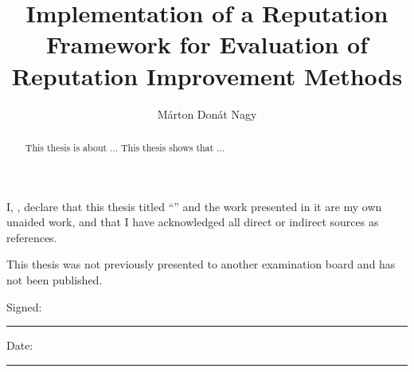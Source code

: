 \documentclass[%
    ]{\PathToTumTemplate/thesis/tum_thesis}
\title{Implementation of a Reputation Framework for Evaluation of Reputation Improvement Methods}                          %
\author{Márton Donát Nagy}                         %
\begin{document}
\frontmatter

\maketitle

\newcommand{\thecolophon}{  
    \begin{colophon}
        \vspace*{1cm}     
        \begin{minipage}{0.5\textwidth}\begin{flushleft}
        This thesis was typeset using the XeTeX{} 
        typesetting system developed by Jonathan Kew. 
        \end{flushleft}
        \end{minipage}
    \end{colophon}
}


\begin{authordecl}
    \noindent I, \theauthor, declare that this thesis titled
    ``\thetitle'' and the work presented in it are my own unaided
    work, and that I have acknowledged all direct or indirect sources as
    references.

    This thesis was not previously presented to another examination board
    and has not been published.

    \vspace{2em}

    \noindent Signed:\\\vspace{1em}
    \noindent\rule[0.5em]{25em}{0.5pt} %
     
    \noindent Date:\\\vspace{1em}
    \noindent\rule[0.5em]{25em}{0.5pt} %
    \rmfamily
\end{authordecl}
\cleardoublepage


\begin{abstract}
    This thesis is about ...
    This thesis shows that ...
\end{abstract}



\setcounter{tocdepth}{1}
\tableofcontents
\end{document}
